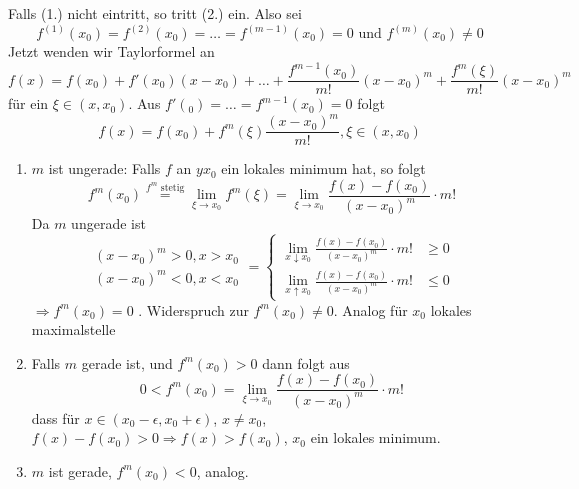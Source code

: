 \begin{beweis}{}
Falls (1.) nicht eintritt, so tritt (2.) ein. Also sei \[f^{(1)}(x_0)=f^{(2)}(x_0)=\dots=f^{(m-1)}(x_0)=0\text{ und }f^{(m)}(x_0)\not=0\]
Jetzt wenden wir Taylorformel an
\[f(x)=f(x_0)+f'(x_0)(x-x_0)+\dots+\frac{f^{m-1}(x_0)}{m!}(x-x_0)^m+\frac{f^{m}(\xi)}{m!}(x-x_0)^m\]
für ein $\xi\in(x,x_0)$. Aus $f'(_0)=\dots=f^{m-1}(x_0)=0$ folgt 
\[f(x)=f(x_0)+f^m(\xi)\frac{(x-x_0)^m}{m!}, \xi\in(x,x_0)\]
\begin{enumerate}
\item[\hspace{4mm}(2.1)] $m$ ist ungerade: Falls $f$ an $yx_0$ ein lokales minimum hat, so folgt 
\[{f^m}({x_0})\mathop  = \limits^{{f^m}{\text{ stetig}}} \mathop {\lim }\limits_{\xi  \to {x_0}} {f^m}(\xi ) = \mathop {\lim }\limits_{\xi  \to {x_0}} \frac{{f(x) - f({x_0})}}{{{{(x - {x_0})}^m}}} \cdot m!\]
Da $m$ ungerade ist 
\[\begin{array}{*{20}{c}}
{{{(x - {x_0})}^m} > 0,x > {x_0}}\\
{{{(x - {x_0})}^m} < 0,x < {x_0}}
\end{array}=\begin{cases}
\lim\limits_{x\downarrow x_0}\frac{f(x)-f(x_0)}{(x-x_0)^m}\cdot m! & \geq 0\\
\lim\limits_{x\uparrow x_0}\frac{f(x)-f(x_0)}{(x-x_0)^m}\cdot m! & \leq 0
\end{cases}\]
$\Rightarrow f^m(x_0)=0$ . Widerspruch zur $f^m(x_0)\not=0$. Analog für $x_0$ lokales maximalstelle
\item[\hspace{4mm}(2.2)] Falls $m$ gerade ist, und $f^m(x_0)>0$ dann folgt aus 
\[0<f^m(x_0)=\lim\limits_{\xi\to x_0}\frac{f(x)-f(x_0)}{(x-x_0)^m}\cdot m!\]
dass für $x\in(x_0-\epsilon, x_0+\epsilon)$, $x\not=x_0$, $f(x)-f(x_0)>0\Rightarrow f(x)>f(x_0)$, $x_0$ ein lokales minimum.
\item[\hspace{4mm}(2.3)] $m$ ist gerade,  $f^m(x_0)<0$, analog.
\end{enumerate}
\end{beweis}

